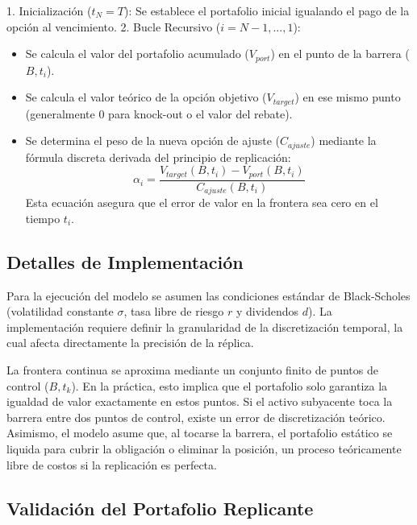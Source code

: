   1. Inicialización ($t_N=T$): Se establece el portafolio inicial igualando el pago de la opción al vencimiento.
  2. Bucle Recursivo ($i=N-1,...,1$): 
    \begin{itemize} 
      \item Se calcula el valor del portafolio acumulado ($V_{port}$) en el punto de la barrera ($B,t_i$).
      
      \item Se calcula el valor teórico de la opción objetivo ($V_{target}$) en ese mismo punto (generalmente $0$ para knock-out o el valor del rebate).
      
      \item Se determina el peso de la nueva opción de ajuste ($C_{ajuste}$) mediante la fórmula discreta derivada del principio de replicación:
        \begin{equation} 
          \alpha_i = \frac{V_{target}(B, t_i) - V_{port}(B, t_i)}{C_{ajuste}(B, t_i)} 
        \end{equation} 
        Esta ecuación asegura que el error de valor en la frontera sea cero en el tiempo $t_i$. 
    \end{itemize}

\subsection{Detalles de Implementación}

Para la ejecución del modelo se asumen las condiciones estándar de Black-Scholes (volatilidad constante $\sigma$, tasa libre de riesgo $r$ y dividendos $d$). La implementación requiere definir la granularidad de la discretización temporal, la cual afecta directamente la precisión de la réplica.

La frontera continua se aproxima mediante un conjunto finito de puntos de control ($B,t_k$). En la práctica, esto implica que el portafolio solo garantiza la igualdad de valor exactamente en estos puntos. Si el activo subyacente toca la barrera entre dos puntos de control, existe un error de discretización teórico. Asimismo, el modelo asume que, al tocarse la barrera, el portafolio estático se liquida para cubrir la obligación o eliminar la posición, un proceso teóricamente libre de costos si la replicación es perfecta.

\subsection{Validación del Portafolio Replicante}

